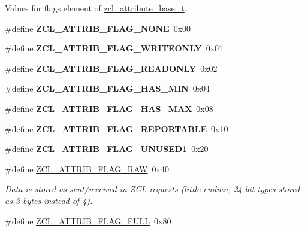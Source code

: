 \label{_amgrp01747264fe7bf50731df0522c351974e}%
Values for {\ttfamily flags} element of \hyperlink{structzcl__attribute__base__t}{zcl\-\_\-attribute\-\_\-base\-\_\-t}. \begin{DoxyCompactItemize}
\item 
\hypertarget{group__zcl_gadfb37ba33684e81ca1bca08f0baa66dc}{\#define {\bfseries Z\-C\-L\-\_\-\-A\-T\-T\-R\-I\-B\-\_\-\-F\-L\-A\-G\-\_\-\-N\-O\-N\-E}~0x00}\label{group__zcl_gadfb37ba33684e81ca1bca08f0baa66dc}

\item 
\hypertarget{group__zcl_ga6103eeb5c0c701821394eab09d4fa9d3}{\#define {\bfseries Z\-C\-L\-\_\-\-A\-T\-T\-R\-I\-B\-\_\-\-F\-L\-A\-G\-\_\-\-W\-R\-I\-T\-E\-O\-N\-L\-Y}~0x01}\label{group__zcl_ga6103eeb5c0c701821394eab09d4fa9d3}

\item 
\hypertarget{group__zcl_ga68b4663d5c6611aa5df04d77cde570f7}{\#define {\bfseries Z\-C\-L\-\_\-\-A\-T\-T\-R\-I\-B\-\_\-\-F\-L\-A\-G\-\_\-\-R\-E\-A\-D\-O\-N\-L\-Y}~0x02}\label{group__zcl_ga68b4663d5c6611aa5df04d77cde570f7}

\item 
\hypertarget{group__zcl_gad45fe12534c2dfca4475a5311c123612}{\#define {\bfseries Z\-C\-L\-\_\-\-A\-T\-T\-R\-I\-B\-\_\-\-F\-L\-A\-G\-\_\-\-H\-A\-S\-\_\-\-M\-I\-N}~0x04}\label{group__zcl_gad45fe12534c2dfca4475a5311c123612}

\item 
\hypertarget{group__zcl_ga9414f883d371589bd69a8508be794452}{\#define {\bfseries Z\-C\-L\-\_\-\-A\-T\-T\-R\-I\-B\-\_\-\-F\-L\-A\-G\-\_\-\-H\-A\-S\-\_\-\-M\-A\-X}~0x08}\label{group__zcl_ga9414f883d371589bd69a8508be794452}

\item 
\hypertarget{group__zcl_gab8576636338997753adc686493184f91}{\#define {\bfseries Z\-C\-L\-\_\-\-A\-T\-T\-R\-I\-B\-\_\-\-F\-L\-A\-G\-\_\-\-R\-E\-P\-O\-R\-T\-A\-B\-L\-E}~0x10}\label{group__zcl_gab8576636338997753adc686493184f91}

\item 
\hypertarget{group__zcl_gab546a9b7cfef2d6f57b73b4e12ccf401}{\#define {\bfseries Z\-C\-L\-\_\-\-A\-T\-T\-R\-I\-B\-\_\-\-F\-L\-A\-G\-\_\-\-U\-N\-U\-S\-E\-D1}~0x20}\label{group__zcl_gab546a9b7cfef2d6f57b73b4e12ccf401}

\item 
\#define \hyperlink{group__zcl_gae40d06ea09e652f6c68fd13e61eb9624}{Z\-C\-L\-\_\-\-A\-T\-T\-R\-I\-B\-\_\-\-F\-L\-A\-G\-\_\-\-R\-A\-W}~0x40
\begin{DoxyCompactList}\small\item\em Data is stored as sent/received in Z\-C\-L requests (little-\/endian, 24-\/bit types stored as 3 bytes instead of 4). \end{DoxyCompactList}\item 
\hypertarget{group__zcl_ga40104652d30fa17b7ea5dde9e8b788b8}{\#define \hyperlink{group__zcl_ga40104652d30fa17b7ea5dde9e8b788b8}{Z\-C\-L\-\_\-\-A\-T\-T\-R\-I\-B\-\_\-\-F\-L\-A\-G\-\_\-\-F\-U\-L\-L}~0x80}\label{group__zcl_ga40104652d30fa17b7ea5dde9e8b788b8}


\end{DoxyCompactItemize}
